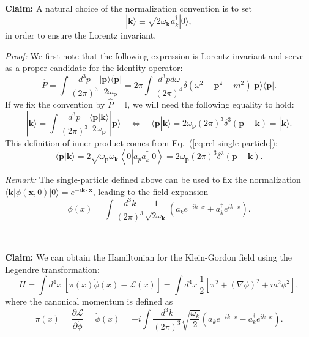 \documentclass[aps,prb,superscriptaddress,nofootinbib]{revtex4}
\begin{document}
\

\noindent\textbf{Claim:}
A natural choice of the normalization convention is to set
\begin{equation}
	|\bm{k}\rangle \equiv \sqrt{2\omega_{\bm k}} a_{k}^{\dagger}|0\rangle,
	\label{eq:rel-single-particle}
\end{equation}
in order to ensure the Lorentz invariant.

\noindent\textit{Proof:}
We first note that the following expression is Lorentz invariant and serve as a proper candidate for the identity operator:
\begin{equation*}
	\hat P = \int \frac{d^{3} p}{(2\pi)^{3}} \frac{|\bm{p}\rangle\langle\bm{p}|}{2\omega_{\bm p}}
	=2\pi \int \frac{d^{3} p d\omega}{(2\pi)^{4}} \delta(\omega^2-{\bm{p}}^2-m^2) |\bm p\rangle\langle \bm p|.
\end{equation*}
If we fix the convention by $\hat P = \hat{\mathbb I}$, we will need the following equality to hold:
\begin{equation*}
	|\bm{k}\rangle
	=\int \frac{d^{3} p}{(2\pi)^{3}} \frac{\langle\bm{p}|\bm{k}\rangle}{2\omega_{\bm p}}|\bm{p}\rangle 
	\quad \Longleftrightarrow \quad
	\langle\bm{p}|\bm{k}\rangle 
	= 2\omega_{\bm p}(2\pi)^3 \delta^3(\bm{p}-\bm{k})
	=|\bm{k}\rangle.
\end{equation*}
This definition of inner product comes from Eq.~(\ref{eq:rel-single-particle}):
\begin{equation*}
	\langle\bm{p}|\bm{k}\rangle 
	= 2\sqrt{\omega_{\bm p} \omega_{\bm k}}\left\langle 0\left|a_{p} a_{k}^{\dagger}\right| 0\right\rangle
	= 2 \omega_{\bm p}(2\pi)^{3} \delta^{3}(\bm{p}-\bm{k}).
\end{equation*}

\noindent\textit{Remark:}
The single-particle defined above can be used to fix the normalization $\langle \bm k|\phi(\bm x,0)|0\rangle = e^{-i \bm k\cdot \bm x}$, leading to the field expansion
\begin{equation}
	\phi(x)
	=\int \frac{d^{3} k}{(2\pi)^{3}} \frac{1}{\sqrt{2\omega_{\bm k}}}\left(a_k 
		e^{-i k \cdot x}+a_k^{\dagger} e^{i k \cdot x}\right).
\end{equation}

\

\noindent\textbf{Claim:}
We can obtain the Hamiltonian for the Klein-Gordon field using the Legendre transformation:
\begin{equation}
	H = \int d^4 x\ \left[\pi(x) \dot{\phi}(x) - \mathcal L(x) \right] 
	= \int d^4 x\ \frac{1}{2} \left[\pi^2 + (\nabla \phi)^2 + m^2 \phi^2 \right],
\end{equation}
where the canonical momentum is defined as
\begin{equation}
	\pi(x) = \frac{\partial \mathcal L}{\partial \dot{\phi}} = \dot{\phi}(x) 
	= -i\int \frac{d^{3} k}{(2\pi)^{3}} \sqrt{\frac{\omega_{k}}{2}}\left(a_k 
		e^{-i k \cdot x} - a_k^{\dagger} e^{i k \cdot x}\right).
\end{equation}
\end{document}
